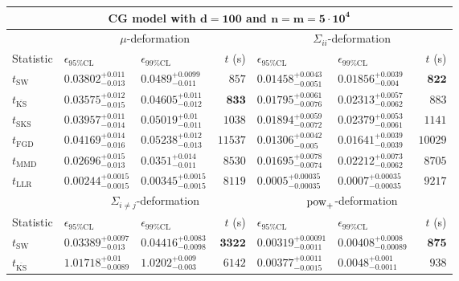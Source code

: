 \begin{tabular}{l|llr|llr}
	\toprule
	\multicolumn{7}{c}{{\bf CG model with $\mathbf{d=100}$ and $\mathbf{n=m=5\cdot 10^{4}}$}} \\
	\toprule
	\multicolumn{1}{c}{} & \multicolumn{3}{c}{$\mu$-deformation} & \multicolumn{3}{c}{$\Sigma_{ii}$-deformation} \\
	Statistic & $\epsilon_{95\%\mathrm{CL}}$ & $\epsilon_{99\%\mathrm{CL}}$ & $t$ (s) & $\epsilon_{95\%\mathrm{CL}}$ & $\epsilon_{99\%\mathrm{CL}}$ & $t$ (s) \\
	\midrule
	$t_{\mathrm{SW}}$ & $0.03802_{-0.013}^{+0.011}$ & $0.0489_{-0.011}^{+0.0099}$ & $857$ & $0.01458_{-0.0051}^{+0.0043}$ & $0.01856_{-0.004}^{+0.0039}$ & ${\mathbf{822}}$ \\
	$t_{\overline{\mathrm{KS}}}$ & $0.03575_{-0.015}^{+0.012}$ & $0.04605_{-0.012}^{+0.011}$ & ${\mathbf{833}}$ & $0.01795_{-0.0076}^{+0.0061}$ & $0.02313_{-0.0062}^{+0.0057}$ & $883$ \\
	$t_{\mathrm{SKS}}$ & $0.03957_{-0.014}^{+0.011}$ & $0.05019_{-0.011}^{+0.01}$ & $1038$ & $0.01894_{-0.0072}^{+0.0059}$ & $0.02379_{-0.0061}^{+0.0053}$ & $1141$ \\
	$t_{\mathrm{FGD}}$ & $0.04169_{-0.016}^{+0.014}$ & $0.05238_{-0.013}^{+0.012}$ & $11537$ & ${\mathbf{0.01306_{-0.005}^{+0.0042}}}$ & ${\mathbf{0.01641_{-0.0039}^{+0.0039}}}$ & $10029$ \\
	$t_{\mathrm{MMD}}$ & ${\mathbf{0.02696_{-0.013}^{+0.015}}}$ & ${\mathbf{0.0351_{-0.011}^{+0.014}}}$ & $8530$ & $0.01695_{-0.0074}^{+0.0078}$ & $0.02212_{-0.0062}^{+0.0073}$ & $8705$ \\
	$t_{\mathrm{LLR}}$ & $0.00244_{-0.0015}^{+0.0015}$ & $0.00345_{-0.0015}^{+0.0015}$ & $8119$ & $0.0005_{-0.00035}^{+0.00035}$ & $0.0007_{-0.00035}^{+0.00035}$ & $9217$ \\
	\toprule
	\multicolumn{1}{c}{} & \multicolumn{3}{c}{$\Sigma_{i\neq j}$-deformation} & \multicolumn{3}{c}{$\rm{pow}_{+}$-deformation} \\
	Statistic & $\epsilon_{95\%\mathrm{CL}}$ & $\epsilon_{99\%\mathrm{CL}}$ & $t$ (s) & $\epsilon_{95\%\mathrm{CL}}$ & $\epsilon_{99\%\mathrm{CL}}$ & $t$ (s) \\
	\midrule
	$t_{\mathrm{SW}}$ & $0.03389_{-0.013}^{+0.0097}$ & $0.04416_{-0.0098}^{+0.0083}$ & ${\mathbf{3322}}$ & $0.00319_{-0.0011}^{+0.00091}$ & $0.00408_{-0.00089}^{+0.0008}$ & ${\mathbf{875}}$ \\
	$t_{\overline{\mathrm{KS}}}$ & $1.01718_{-0.0089}^{+0.01}$ & $1.0202_{-0.003}^{+0.009}$ & $6142$ & $0.00377_{-0.0015}^{+0.0011}$ & $0.0048_{-0.0011}^{+0.001}$ & $938$ \\

\end{tabular}
